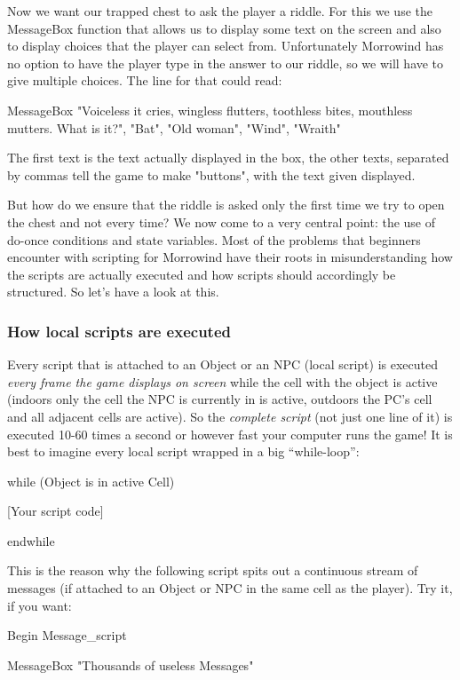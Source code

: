 \documentclass[
]{article}
\begin{document}
Now we want our trapped chest to ask the player a riddle. For this we
use the MessageBox function that allows us to display some text on the
screen and also to display choices that the player can select from.
Unfortunately Morrowind has no option to have the player type in the
answer to our riddle, so we will have to give multiple choices. The line
for that could read:

MessageBox "Voiceless it cries, wingless flutters, toothless bites,
mouthless mutters. What is it?", "Bat", "Old woman", "Wind", "Wraith"

The first text is the text actually displayed in the box, the other
texts, separated by commas tell the game to make "buttons", with the
text given displayed.

But how do we ensure that the riddle is asked only the first time we try
to open the chest and not every time? We now come to a very central
point: the use of do-once conditions and state variables. Most of the
problems that beginners encounter with scripting for Morrowind have
their roots in misunderstanding how the scripts are actually executed
and how scripts should accordingly be structured. So let's have a look
at this.

\hypertarget{how-local-scripts-are-executed}{%
\subsubsection{How local scripts are
executed}\label{how-local-scripts-are-executed}}

Every script that is attached to an Object or an NPC (local script) is
executed \emph{every frame the game displays on screen} while the cell
with the object is active (indoors only the cell the NPC is currently in
is active, outdoors the PC's cell and all adjacent cells are active). So
the \emph{complete script} (not just one line of it) is executed 10-60
times a second or however fast your computer runs the game! It is best
to imagine every local script wrapped in a big ``while-loop'':

while (Object is in active Cell)

{[}Your script code{]}

endwhile

This is the reason why the following script spits out a continuous
stream of messages (if attached to an Object or NPC in the same cell as
the player). Try it, if you want:

Begin Message\_script

MessageBox "Thousands of useless Messages"
\end{document}
